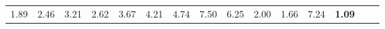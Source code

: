 \begin{tabular}{ll|rrrrrrrrr|rrrr}
  


  
  1.89 & 2.46 & 3.21 & 2.62 & 3.67 & 4.21 & 4.74 & 7.50 & 6.25 & 2.00 & 1.66 & 7.24 & \textbf{1.09} \\


\end{tabular}
